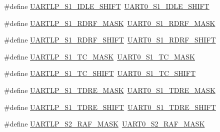 \begin{DoxyCompactItemize}
\item 
\#define \hyperlink{group___backward___compatibility___symbols_gae842244614239cddb394428e2e1f8bc0}{U\+A\+R\+T\+L\+P\+\_\+\+S1\+\_\+\+I\+D\+L\+E\+\_\+\+S\+H\+I\+FT}~\hyperlink{group___u_a_r_t0___register___masks_gac68bfcf79c38331eb53678c7578e5937}{U\+A\+R\+T0\+\_\+\+S1\+\_\+\+I\+D\+L\+E\+\_\+\+S\+H\+I\+FT}
\item 
\#define \hyperlink{group___backward___compatibility___symbols_gac731a20d480bddb1610a7a740e71ebc9}{U\+A\+R\+T\+L\+P\+\_\+\+S1\+\_\+\+R\+D\+R\+F\+\_\+\+M\+A\+SK}~\hyperlink{group___u_a_r_t0___register___masks_gabfc8c446e35e26275bc966d2a9c50115}{U\+A\+R\+T0\+\_\+\+S1\+\_\+\+R\+D\+R\+F\+\_\+\+M\+A\+SK}
\item 
\#define \hyperlink{group___backward___compatibility___symbols_ga431c49f191f29ccbeade2bd87502531c}{U\+A\+R\+T\+L\+P\+\_\+\+S1\+\_\+\+R\+D\+R\+F\+\_\+\+S\+H\+I\+FT}~\hyperlink{group___u_a_r_t0___register___masks_ga64f8830cd7e5c3c69d91f4747137f323}{U\+A\+R\+T0\+\_\+\+S1\+\_\+\+R\+D\+R\+F\+\_\+\+S\+H\+I\+FT}
\item 
\#define \hyperlink{group___backward___compatibility___symbols_ga1110069e543f57629a601fabe094b80f}{U\+A\+R\+T\+L\+P\+\_\+\+S1\+\_\+\+T\+C\+\_\+\+M\+A\+SK}~\hyperlink{group___u_a_r_t0___register___masks_ga0d63e21fc62457b6a441c82d0ed21980}{U\+A\+R\+T0\+\_\+\+S1\+\_\+\+T\+C\+\_\+\+M\+A\+SK}
\item 
\#define \hyperlink{group___backward___compatibility___symbols_ga61cc5706017331c9f55a89a10c291602}{U\+A\+R\+T\+L\+P\+\_\+\+S1\+\_\+\+T\+C\+\_\+\+S\+H\+I\+FT}~\hyperlink{group___u_a_r_t0___register___masks_ga00448db2843a19047ebd7ae86f2cb1fd}{U\+A\+R\+T0\+\_\+\+S1\+\_\+\+T\+C\+\_\+\+S\+H\+I\+FT}
\item 
\#define \hyperlink{group___backward___compatibility___symbols_ga8f434cacc5911ca08ef1e5d0275da950}{U\+A\+R\+T\+L\+P\+\_\+\+S1\+\_\+\+T\+D\+R\+E\+\_\+\+M\+A\+SK}~\hyperlink{group___u_a_r_t0___register___masks_ga54aac82fa657a6a49064908004abc80d}{U\+A\+R\+T0\+\_\+\+S1\+\_\+\+T\+D\+R\+E\+\_\+\+M\+A\+SK}
\item 
\#define \hyperlink{group___backward___compatibility___symbols_gad1469491e7fcddf3521ef7d5ac86dc04}{U\+A\+R\+T\+L\+P\+\_\+\+S1\+\_\+\+T\+D\+R\+E\+\_\+\+S\+H\+I\+FT}~\hyperlink{group___u_a_r_t0___register___masks_gaf1ba1833eeb3d207610024627260a23a}{U\+A\+R\+T0\+\_\+\+S1\+\_\+\+T\+D\+R\+E\+\_\+\+S\+H\+I\+FT}
\item 
\#define \hyperlink{group___backward___compatibility___symbols_gab739ff1ae228bcdf87973e919ad42c12}{U\+A\+R\+T\+L\+P\+\_\+\+S2\+\_\+\+R\+A\+F\+\_\+\+M\+A\+SK}~\hyperlink{group___u_a_r_t0___register___masks_gad94f9eb4b442dddbafa335f05b46fb12}{U\+A\+R\+T0\+\_\+\+S2\+\_\+\+R\+A\+F\+\_\+\+M\+A\+SK}

\end{DoxyCompactItemize}
